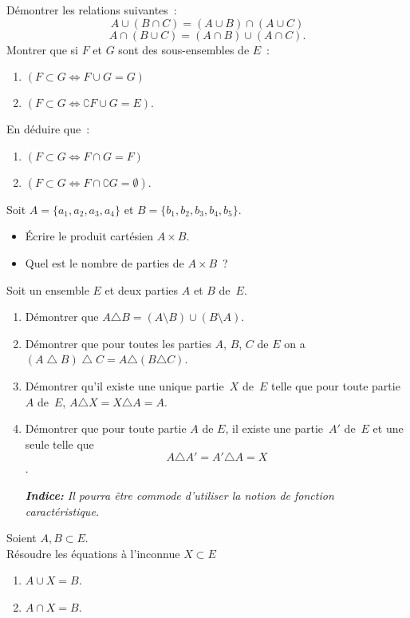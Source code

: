 \documentclass[10pt, a4paper, twocolumn]{homework}
\begin{document}
\exercice
 Démontrer les relations suivantes~:
$$ A \cup(B \cap C) = (A \cup B) \cap(A \cup C)$$
 $$A \cap(B \cup C) = (A \cap B) \cup(A \cap C).$$
\exercice
Montrer que si $F$ et $G$ sont des sous-ensembles de $E$~:
\begin{enumerate}
  \item $(F \subset G \iff F \cup G = G )$
  \item $(F \subset G \iff \complement F \cup G = E).$
\end{enumerate}
En déduire que~: 
\begin{enumerate}
  \item $ (F \subset G \iff F \cap G = F)$
  \item $(F \subset G \iff F \cap\complement G = \emptyset).$ 
\end{enumerate}
\exercice
 Soit $A= \{a_1, a_2, a_3, a_4\}$ et $B= \{b_1, b_2, b_3, b_4 ,b_5\}$.
 \begin{itemize}
   \item Écrire le produit cartésien $A \times B$.
   \item Quel est le nombre de parties de $A \times B$~?
 \end{itemize}
 \exercice
Soit un ensemble $E$ et deux parties $A$ et $B$ de~$E$. 
\begin{enumerate}
\item Démontrer que $A \triangle B = (A \setminus B) \cup(B \setminus A)$.
\item Démontrer que pour toutes les parties $A$, $B$, $C$ de $E$ on a
$(A \bigtriangleup B) \bigtriangleup C = A \triangle(B \triangle C)$.
\item Démontrer qu'il existe une unique partie~$X$ de~$E$ telle que 
pour toute partie~$A$ de~$E$, $A \triangle X = X \triangle A = A$.
\item Démontrer que pour toute partie $A$ de $E$, il existe une partie~$A'$
de~$E$ et une seule telle que $$A \triangle A' = A' \triangle A = X$$.

\textit{ \textbf{Indice:}  \scriptsize Il pourra être commode 
d'utiliser la notion de fonction caractéristique.}
\end{enumerate}
\exercice
Soient $A, B \subset E$.\\
R\'esoudre les \'equations \`a l'inconnue $X \subset E$
\begin{enumerate}
\item $A \cup X = B$.
\item $A \cap X = B$.
\end{enumerate}
\end{document}
